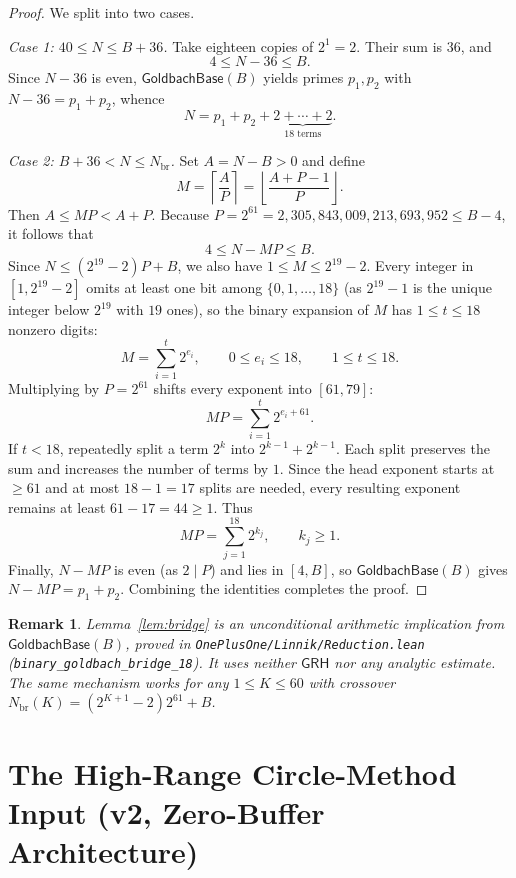 \documentclass[11pt,a4paper]{article}
\newtheorem{remark}[theorem]{Remark}
\newcommand{\GoldbachBase}{\mathsf{GoldbachBase}}
\newcommand{\GRH}{\mathsf{GRH}}
\begin{document}
\begin{proof}
We split into two cases.

\medskip\noindent\emph{Case 1: $40 \le N \le B + 36$.}
Take eighteen copies of $2^1 = 2$. Their sum is $36$, and
\[
  4 \le N - 36 \le B.
\]
Since $N - 36$ is even, $\GoldbachBase(B)$ yields primes $p_1, p_2$ with $N - 36 = p_1 + p_2$, whence
\[
  N = p_1 + p_2 + \underbrace{2 + \cdots + 2}_{18\text{ terms}}.
\]

\medskip\noindent\emph{Case 2: $B + 36 < N \le N_{\mathrm{br}}$.}
Set $A = N - B > 0$ and define
\[
  M = \left\lceil \frac{A}{P} \right\rceil = \left\lfloor \frac{A + P - 1}{P} \right\rfloor.
\]
Then $A \le MP < A + P$. Because $P = 2^{61} = 2{,}305{,}843{,}009{,}213{,}693{,}952 \le B - 4$, it follows that
\[
  4 \le N - MP \le B.
\]
Since $N \le (2^{19} - 2)P + B$, we also have $1 \le M \le 2^{19} - 2$. Every integer in $[1, 2^{19}-2]$ omits at least one bit among $\{0, 1, \dots, 18\}$ (as $2^{19}-1$ is the unique integer below $2^{19}$ with $19$ ones), so the binary expansion of $M$ has $1 \le t \le 18$ nonzero digits:
\[
  M = \sum_{i=1}^{t} 2^{e_i}, \qquad 0 \le e_i \le 18, \qquad 1 \le t \le 18.
\]
Multiplying by $P = 2^{61}$ shifts every exponent into $[61, 79]$:
\[
  MP = \sum_{i=1}^{t} 2^{e_i + 61}.
\]
If $t < 18$, repeatedly split a term $2^k$ into $2^{k-1} + 2^{k-1}$. Each split preserves the sum and increases the number of terms by $1$. Since the head exponent starts at $\ge 61$ and at most $18 - 1 = 17$ splits are needed, every resulting exponent remains at least $61 - 17 = 44 \ge 1$. Thus
\[
  MP = \sum_{j=1}^{18} 2^{k_j}, \qquad k_j \ge 1.
\]
Finally, $N - MP$ is even (as $2 \mid P$) and lies in $[4, B]$, so $\GoldbachBase(B)$ gives $N - MP = p_1 + p_2$. Combining the identities completes the proof.
\end{proof}

\begin{remark}
Lemma~\ref{lem:bridge} is an unconditional arithmetic implication from $\GoldbachBase(B)$, proved in \texttt{OnePlusOne/Linnik/Reduction.lean} (\texttt{binary\_goldbach\_bridge\_18}). It uses neither $\GRH$ nor any analytic estimate. The same mechanism works for any $1 \le K \le 60$ with crossover $N_{\mathrm{br}}(K) = (2^{K+1}-2)2^{61} + B$.
\end{remark}

\section{The High-Range Circle-Method Input (v2, Zero-Buffer Architecture)}
\end{document}
